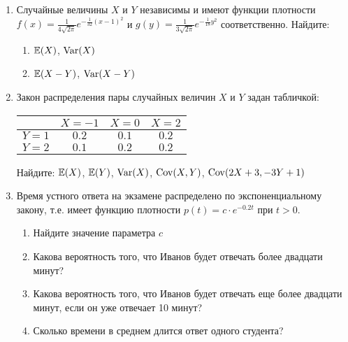 \begin{enumerate}
\item Случайные величины $X$ и $Y$ независимы и имеют функции плотности $f(x)=\frac{1}{4\sqrt{2\pi } } e^{-\frac{1}{32} (x-1)^{2} }$ и $g(y)=\frac{1}{3\sqrt{2\pi } } e^{-\frac{1}{18} y^{2} }$ соответственно.
Найдите:
\begin{enumerate}
\item $\mathbb{E}(X)$, $\operatorname{Var}(X)$
\item $\mathbb{E}(X-Y)$, $\operatorname{Var}(X-Y)$
\end{enumerate}



\item Закон распределения пары случайных величин $X$ и $Y$ задан табличкой:

\begin{tabular}{@{}cccc@{}}
\toprule
    & $X=-1$ & $X=0$ & $X=2$ \\ \midrule
$Y=1$ & $0.2$  & $0.1$   & $0.2$ \\
$Y=2$ & $0.1$  & $0.2$ & $0.2$ \\ \bottomrule
\end{tabular}

Найдите: $\mathbb{E}(X)$, $\mathbb{E}(Y)$, $\operatorname{Var}(X)$, $\operatorname{Cov}(X,Y)$, $\operatorname{Cov}(2X+3,-3Y+1)$


\item Время устного ответа на экзамене распределено по экспоненциальному закону, т.е. имеет функцию плотности $p(t)=c\cdot e^{-0.2t}$ при $t>0$.
\begin{enumerate}
\item Найдите значение параметра $c$
\item Какова вероятность того, что Иванов будет отвечать более двадцати минут?
\item Какова вероятность того, что Иванов будет отвечать еще более двадцати минут, если он уже отвечает 10 минут?
\item Сколько времени в среднем длится ответ одного студента?
\end{enumerate}


\end{enumerate}
